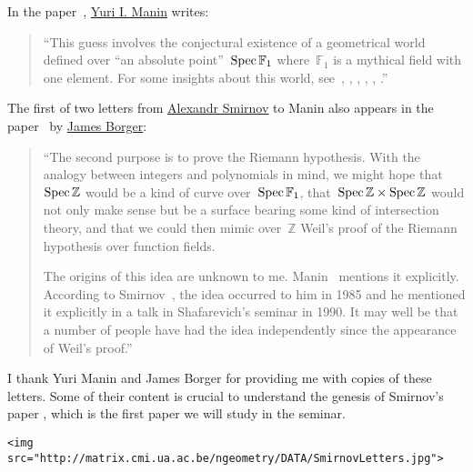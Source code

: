 In the paper~\cite{the-notion-of-dimension-in-geometry-and-algebra}, \href{http://en.wikipedia.org/wiki/Yuri_I._Manin}{Yuri I. Manin} writes:

\begin{quote}
  ``This guess involves the conjectural existence of a geometrical world defined over ``an absolute point''~$\operatorname{Spec}\mathbb{F}_1$ where~$\mathbb{F}_1$ is a mythical field with one element. For some insights about this world, see~\cite{sur-les-analogues-algebriques-des-groupes-semi-simples-complexes}, \cite{hurwitz-inequalities-for-number-fields}, \cite{letters-to-manin}, \cite{cohomology-determinants-and-reciprocity-laws}, \cite{three-dimensional-hyperbolic-geometry}, \cite{les-varietes-sur-le-corps-a-un-element}.''
\end{quote}

The first of two letters from \href{http://www.pdmi.ras.ru/eng/perso/smirnov.php}{Alexandr Smirnov} to Manin also appears in the paper~\cite{lambda-rings-and-the-field-with-one-element} by \href{http://maths.anu.edu.au/~borger/}{James Borger}:

\begin{quote}
  ``The second purpose is to prove the Riemann hypothesis. With the analogy between integers and polynomials in mind, we might hope that~$\operatorname{Spec}\mathbb{Z}$ would be a kind of curve over~$\operatorname{Spec}\mathbb{F}_1$, that~$\operatorname{Spec}\mathbb{Z}\times\operatorname{Spec}\mathbb{Z}$ would not only make sense but be a surface bearing some kind of intersection theory, and that we could then mimic over~$\mathbb{Z}$ Weil's proof \cite{on-the-riemann-hypothesis-in-function-fields} of the Riemann hypothesis over function fields.
  
  The origins of this idea are unknown to me. Manin~\cite{lectures-on-zeta-functions-and-motives} mentions it explicitly. According to Smirnov~\cite{letters-to-manin}, the idea occurred to him in 1985 and he mentioned it explicitly in a talk in Shafarevich's seminar in 1990. It may well be that a number of people have had the idea independently since the appearance of Weil’s proof.''
\end{quote}

I thank Yuri Manin and James Borger for providing me with copies of these letters. Some of their content is crucial to understand the genesis of Smirnov's paper \cite{hurwitz-inequalities-for-number-fields}, which is the first paper we will study in the seminar.

\verb|<img src="http://matrix.cmi.ua.ac.be/ngeometry/DATA/SmirnovLetters.jpg">|

